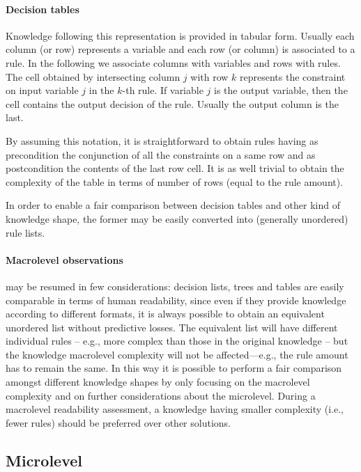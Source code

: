 \documentclass[sigconf]{acmart}
\begin{document}
\paragraph{Decision tables}

Knowledge following this representation is provided in tabular form.
%
Usually each column (or row) represents a variable and each row (or column) is associated to a rule.
%
In the following we associate columns with variables and rows with rules.
%
The cell obtained by intersecting column $j$ with row $k$ represents the constraint on input variable $j$ in the $k$-th rule.
%
If variable $j$ is the output variable, then the cell contains the output decision of the rule.
%
Usually the output column is the last.

By assuming this notation, it is straightforward to obtain rules having as precondition the conjunction of all the constraints on a same row and as postcondition the contents of the last row cell.
%
It is as well trivial to obtain the complexity of the table in terms of number of rows (equal to the rule amount).

In order to enable a fair comparison between decision tables and other kind of knowledge shape, the former may be easily converted into (generally unordered) rule lists.

\paragraph{Macrolevel observations}

 may be resumed in few considerations: decision lists, trees and tables are easily comparable in terms of human readability, since even if they provide knowledge according to different formats, it is always possible to obtain an equivalent unordered list without predictive losses.
%
The equivalent list will have different individual rules -- e.g., more complex than those in the original knowledge -- but the knowledge macrolevel complexity will not be affected---e.g., the rule amount has to remain the same.
%
In this way it is possible to perform a fair comparison amongst different knowledge shapes by only focusing on the macrolevel complexity and on further considerations about the microlevel.
%
During a macrolevel readability assessment, a knowledge having smaller complexity (i.e., fewer rules) should be preferred over other solutions.

\subsection{Microlevel}
\end{document}

